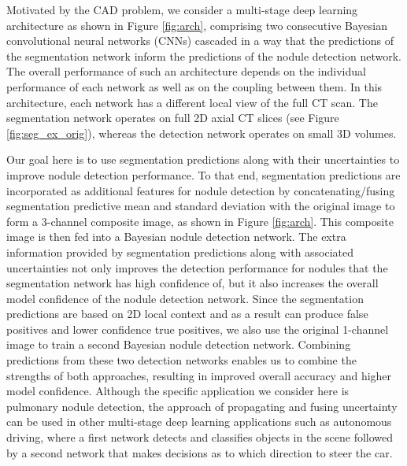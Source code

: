 \documentclass{article}
\begin{document}
Motivated by the CAD problem, we consider a multi-stage deep learning architecture as shown in Figure \ref{fig:arch}, comprising two consecutive Bayesian convolutional neural networks (CNNs) cascaded in a way that the predictions of the segmentation network inform the predictions of the nodule detection network. The overall performance of such an architecture depends on the individual performance of each network as well as on the coupling between them. In this architecture, each network has a different local view of the full CT scan. The segmentation network operates on full 2D axial CT slices (see Figure \ref{fig:seg_ex_orig}), whereas the detection network operates on small 3D volumes. 

Our goal here is to use segmentation predictions along with their uncertainties to improve nodule detection performance. To that end, segmentation predictions are incorporated as additional features for nodule detection by concatenating/fusing segmentation predictive mean and standard deviation with the original image to form a 3-channel composite image, as shown in Figure \ref{fig:arch}. This composite image is then fed into a Bayesian nodule detection network. The extra information provided by segmentation predictions along with associated uncertainties not only improves the detection performance for nodules that the segmentation network has high confidence of, but it also increases the overall model confidence of the nodule detection network. Since the segmentation predictions are based on 2D local context and as a result can produce false positives and lower confidence true positives, we also use the original 1-channel image to train a second Bayesian nodule detection network. Combining predictions from these two detection networks enables us to combine the strengths of both approaches, resulting in improved overall accuracy and higher model confidence. Although the specific application we consider here is pulmonary nodule detection, the approach of propagating and fusing uncertainty can be used in other multi-stage deep learning applications such as autonomous driving,  where a first network detects and classifies objects in the scene followed by a second network that makes decisions as to which direction to steer the car.     

 
\end{document}
